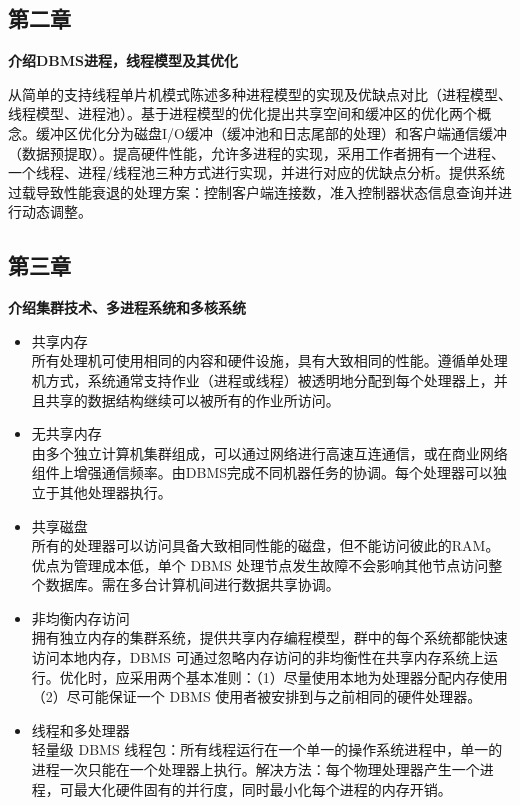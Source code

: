 \documentclass[UTF8,14pt]{article}
\numberwithin{figure}{section}
\begin{document}
\subsection{第二章}
\textbf{介绍DBMS进程，线程模型及其优化}

从简单的支持线程单片机模式陈述多种进程模型的实现及优缺点对比（进程模型、线程模型、进程池）。基于进程模型的优化提出共享空间和缓冲区的优化两个概念。缓冲区优化分为磁盘I/O缓冲（缓冲池和日志尾部的处理）和客户端通信缓冲（数据预提取）。提高硬件性能，允许多进程的实现，采用工作者拥有一个进程、一个线程、进程/线程池三种方式进行实现，并进行对应的优缺点分析。提供系统过载导致性能衰退的处理方案：控制客户端连接数，准入控制器状态信息查询并进行动态调整。
\subsection{第三章}
\textbf{介绍集群技术、多进程系统和多核系统}
\begin{itemize}
      \item 共享内存\\
            所有处理机可使用相同的内容和硬件设施，具有大致相同的性能。遵循单处理机方式，系统通常支持作业（进程或线程）被透明地分配到每个处理器上，并且共享的数据结构继续可以被所有的作业所访问。
      \item 无共享内存\\
            由多个独立计算机集群组成，可以通过网络进行高速互连通信，或在商业网络组件上增强通信频率。由DBMS完成不同机器任务的协调。每个处理器可以独立于其他处理器执行。
      \item 共享磁盘\\
            所有的处理器可以访问具备大致相同性能的磁盘，但不能访问彼此的RAM。优点为管理成本低，单个 DBMS 处理节点发生故障不会影响其他节点访问整个数据库。需在多台计算机间进行数据共享协调。
      \item 非均衡内存访问\\
            拥有独立内存的集群系统，提供共享内存编程模型，群中的每个系统都能快速访问本地内存，DBMS 可通过忽略内存访问的非均衡性在共享内存系统上运行。优化时，应采用两个基本准则：（1）尽量使用本地为处理器分配内存使用（2）尽可能保证一个 DBMS 使用者被安排到与之前相同的硬件处理器。
      \item 线程和多处理器\\
            轻量级 DBMS 线程包：所有线程运行在一个单一的操作系统进程中，单一的进程一次只能在一个处理器上执行。解决方法：每个物理处理器产生一个进程，可最大化硬件固有的并行度，同时最小化每个进程的内存开销。
\end{itemize}
\end{document}
